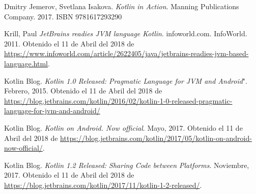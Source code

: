 
\begin{thebibliography}{9}

 Dmitry Jemerov, Svetlana Isakova. \emph{Kotlin in Action}. Manning Publications Company. 2017. ISBN 9781617293290

 Krill, Paul \emph{JetBrains readies JVM language Kotlin}. infoworld.com. InfoWorld. 2011. Obtenido el 11 de Abril del 2018 de \url{https://www.infoworld.com/article/2622405/java/jetbrains-readies-jvm-based-language.html}.

 Kotlin Blog. \emph{Kotlin 1.0 Released: Pragmatic Language for JVM and Android}". Febrero, 2015. Obtenido el 11 de Abril del 2018 de \url{https://blog.jetbrains.com/kotlin/2016/02/kotlin-1-0-released-pragmatic-language-for-jvm-and-android/}

 Kotlin Blog. \emph{Kotlin on Android. Now official}. Mayo, 2017. Obtenido el 11 de Abril del 2018 de \url{https://blog.jetbrains.com/kotlin/2017/05/kotlin-on-android-now-official/}.

 Kotlin Blog. \emph{Kotlin 1.2 Released: Sharing Code between Platforms}. Noviembre, 2017. Obtenido el 11 de Abril del 2018 de \url{https://blog.jetbrains.com/kotlin/2017/11/kotlin-1-2-released/}.

\end{thebibliography}



